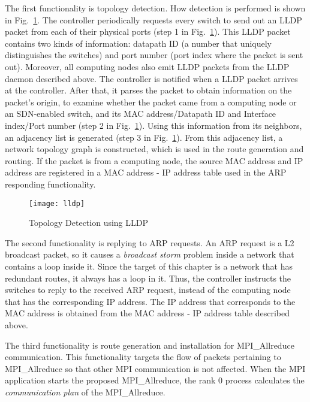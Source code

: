 The first functionality is topology detection. How detection is
performed is shown in Fig.~\ref{fig:lldp}. The controller periodically
requests every switch to send out an LLDP packet from each of their physical
ports (step 1 in Fig.~\ref{fig:lldp}). This LLDP packet contains two kinds of
information: datapath ID (a number that uniquely distinguishes the switches)
and port number (port index where the packet is sent out). Moreover, all
computing nodes also emit LLDP packets from the LLDP daemon described above.
The controller is notified when a LLDP packet arrives at the controller. After
that, it parses the packet to obtain information on the packet's origin, to
examine whether the packet came from a computing node or an SDN-enabled
switch, and its MAC address/Datapath ID and Interface index/Port number (step
2 in Fig.~\ref{fig:lldp}). Using this information from its neighbors, an
adjacency list is generated (step 3 in Fig.~\ref{fig:lldp}). From this
adjacency list, a network topology graph is constructed, which is used in the
route generation and routing. If the packet is from a computing node, the
source MAC address and IP address are registered in a MAC address - IP address
table used in the ARP responding functionality.

\begin{figure}
    \centering
    \texttt{[image: lldp]}
    \caption{Topology Detection using LLDP}%
    \label{fig:lldp}
\end{figure}

The second functionality is replying to ARP requests. An ARP request is
a L2 broadcast packet, so it causes a \emph{broadcast storm} problem
inside a network that contains a loop inside it. Since the target of
this chapter is a network that has redundant routes, it always has a loop
in it. Thus, the controller instructs the switches to reply to the
received ARP request, instead of the computing node that has the
corresponding IP address. The IP address that corresponds to the MAC
address is obtained from the MAC address - IP address table described
above.

The third functionality is route generation and installation for
MPI\_Allreduce communication. This functionality targets the flow of packets
pertaining to MPI\_Allreduce so that other MPI communication is not affected.
When the MPI application starts the proposed MPI\_Allreduce, the rank 0
process calculates the \emph{communication plan} of the MPI\_Allreduce.

